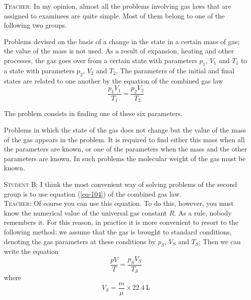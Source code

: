 \documentclass[a4paper,sfsidenotes]{tufte-book}
\begin{document}
\textsc{Teacher:} In my opinion, almost all the problems involving gas laws that are assigned to examinees are quite simple. Most of them belong to one of the following two groups. 
\begin{description}[font=\bfseries, leftmargin=1cm, style=nextline]
\item[First group:] Problems devised on the basis of a change in the state in a certain mass of gas;
the value of the mass is not used. As a result of expansion, heating and other processes, the gas goes
over from a certain state with parameters $p_{1}$, $V_{1}$ and $T_{1}$ to a state with parameters $p_{2}$, $V_{2}$ and $T_{2}$. The parameters of the initial and final states are related to one another by the equation of the combined gas law
\begin{equation}
\frac{p_{1} V_{1}}{T_{1}}  = \frac{p_{2} V_{2}}{T_{2}}
\label{119}
\end{equation}

The problem consists in finding one of these six parameters.

\item[Second group:] Problems in which the state of the gas does not change but the value of the mass of the gas appears in the problem. It is required to find either this mass when all the parameters are known, or one of the parameters when the mass and the other parameters are known. In such problems the molecular weight of the gas must be known.
\end{description}
\textsc{Student B:} I think the most convenient way of solving problems of the second group is to use equation (\ref{eq-104}) of the combined gas law.
\\
\textsc{Teacher:} Of course you can use this equation. To do this, however, you must know the numerical value of the universal gas constant $R$. As a rule, nobody remembers it. For this reason, in practice it is more convenient to resort to the following method: we assume that the gas is brought to standard conditions, denoting the gas parameters at these conditions by $p_{S}$, $V_{S}$ and $T_{S}$; Then we can write the equation
\begin{equation}%
\frac{p V}{T} = \frac{p_{S} V_{S}}{T_{S}}
\label{120}
\end{equation}
where 
\begin{equation*}%
V_{S} =  \frac{m}{\mu} \times \SI{22.4}{\liter}
\end{equation*}
\end{document}
